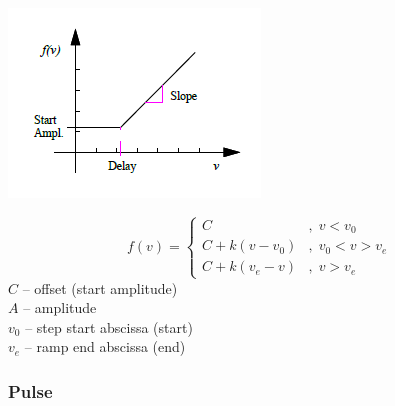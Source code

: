 \noindent
\begin{minipage}{0.45\textwidth}
  \includegraphics[width=\textwidth]{Figures/4-Functions_ramp}
\end{minipage}%
\hfill\begin{minipage}{0.5\textwidth}
  $$
    f(v)=\left\{\begin{array}{ll}
      C          &,\; v < v_0 \\
      C+k(v-v_0) &,\; v_0 < v > v_e \\
      C+k(v_e-v) &,\; v > v_e
    \end{array}\right.
  $$
  $C$ -- offset (start amplitude) \\
  $A$ -- amplitude \\
  $v_0$ -- step start abscissa (start) \\
  $v_e$ -- ramp end abscissa (end)
\end{minipage}

\subsubsection{Pulse}


